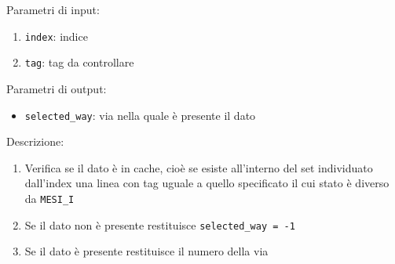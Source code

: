 Parametri di input:
\begin{enumerate}
  \item \texttt{index}: indice
  \item \texttt{tag}: tag da controllare
\end{enumerate}	

Parametri di output:
\begin{itemize}
  \item \texttt{selected\_way}: via nella quale \`e presente il dato
\end{itemize}

Descrizione:	
\begin{enumerate}
  \item Verifica se il dato \`e in cache, cio\`e se esiste all'interno del set individuato dall'index una linea con tag uguale a quello specificato il cui stato \`e diverso da \texttt{MESI\_I}
  \item Se il dato non \`e presente restituisce \texttt{selected\_way = -1}
  \item Se il dato \`e presente restituisce il numero della via
\end{enumerate}




